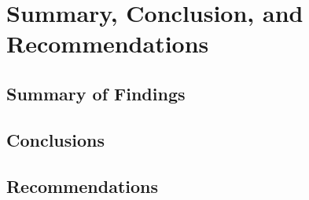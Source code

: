 \chapter{Summary, Conclusion, and Recommendations}\label{ch:5}

\section{Summary of Findings}\label{sec:5-findings}

\section{Conclusions}\label{sec:5-conclusions}

\section{Recommendations}\label{sec:5-recoms}
